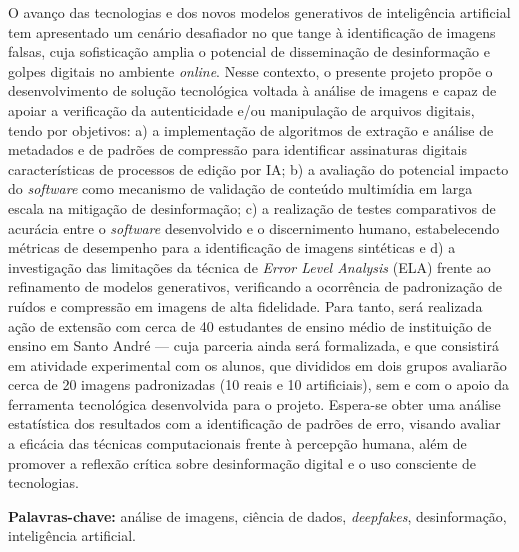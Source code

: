 \justifying
O avanço das tecnologias e dos novos modelos generativos de inteligência
artificial tem apresentado um cenário desafiador no que tange à identificação de
imagens falsas, cuja sofisticação amplia o potencial de disseminação de
desinformação e golpes digitais no ambiente \textit{online}. Nesse contexto, o
presente projeto propõe o desenvolvimento de solução tecnológica voltada à
análise de imagens e capaz de apoiar a verificação da autenticidade e/ou
manipulação de arquivos digitais, tendo por objetivos: a) a implementação de
algoritmos de extração e análise de metadados e de padrões de compressão para
identificar assinaturas digitais características de processos de edição por IA;
b) a avaliação do potencial impacto do \textit{software} como mecanismo de
validação de conteúdo multimídia em larga escala na mitigação de desinformação;
c) a realização de testes comparativos de acurácia entre o \textit{software}
desenvolvido e o discernimento humano, estabelecendo métricas de desempenho para
a identificação de imagens sintéticas e d) a investigação das limitações da
técnica de \textit{Error Level Analysis} (ELA) frente ao refinamento de modelos
generativos, verificando a ocorrência de padronização de ruídos e compressão em
imagens de alta fidelidade. Para tanto, será realizada ação de extensão com cerca
de 40 estudantes de ensino médio de instituição de ensino em Santo André --- cuja
parceria ainda será formalizada, e que consistirá em atividade experimental com
os alunos, que divididos em dois grupos avaliarão cerca de 20 imagens
padronizadas (10 reais e 10 artificiais), sem e com o apoio da ferramenta
tecnológica desenvolvida para o projeto. Espera-se obter uma análise estatística
dos resultados com a identificação de padrões de erro, visando avaliar a eficácia
das técnicas computacionais frente à percepção humana, além de promover a
reflexão crítica sobre desinformação digital e o uso consciente de tecnologias.

\vspace{5mm}
\noindent\textbf{Palavras-chave:} análise de imagens, ciência de dados,
\textit{deepfakes}, desinformação, inteligência artificial.


